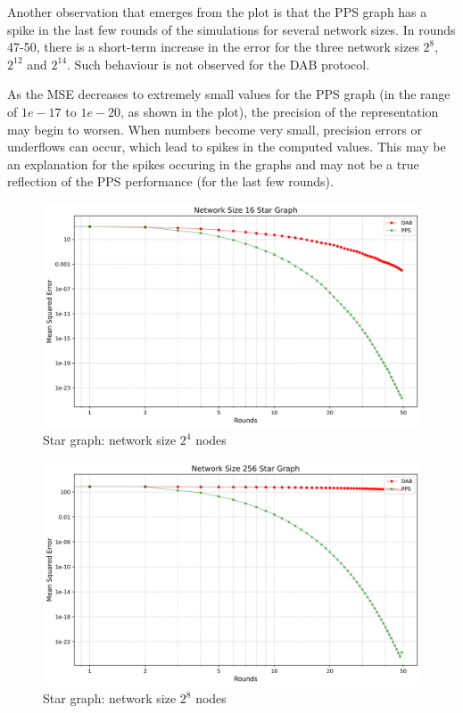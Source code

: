 Another observation that emerges from the plot is that the PPS graph has a spike in the last few rounds of the simulations for several network sizes. In rounds 47-50, there is a short-term increase in the error for the three network sizes $2^{8}$, $2^{12}$ and $2^{14}$. Such behaviour is not observed for the DAB protocol.

As the MSE decreases to extremely small values for the PPS graph (in the range of $1e-17$ to $1e-20$, as shown in the plot), the precision of the representation may begin to worsen. When numbers become very small, precision errors or underflows can occur, which lead to spikes in the computed values. This may be an explanation for the spikes occuring in the graphs and may not be a true reflection of the PPS performance (for the last few rounds).\\
\begin{figure}[H]
    \centering
    \includegraphics[scale=0.5]{figures/starGraphSimulations/DAB_vs_PPS_SG_r50_n16.png}
    \caption{Star graph: network size $2^{4}$ nodes}
    \label{fig:16StarGraph}
\end{figure}

\begin{figure}[H]
    \centering
    \includegraphics[scale=0.5]{figures/starGraphSimulations/DAB_vs_PPS_SG_r50_n256.png}
    \caption{Star graph: network size $2^{8}$ nodes}
    \label{fig:256StarGraph}
\end{figure}

